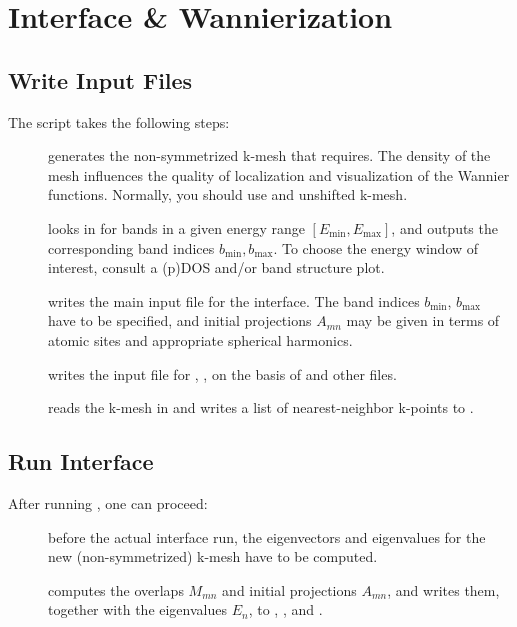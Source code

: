 \section{Interface \& Wannierization}
\label{sec:quitckstart_main}

\subsection{Write Input Files}
\label{sec:init}

The script \initwiiw takes the following steps:
%
\begin{description}
\item[] generates the non-symmetrized k-mesh that
  \wannier requires.  The density of the mesh influences the quality
  of localization and visualization of the Wannier functions.
  Normally, you should use and unshifted k-mesh.
\item[] looks in  for bands in a
  given energy range $[E_\text{min}, E_\text{max}]$, and outputs the
  corresponding band indices $b_\text{min}, b_\text{max}$.  To choose
  the energy window of interest, consult a (p)DOS and/or band
  structure plot.
\item[\writeinwf] writes the main input file  for the
  interface.  The band indices $b_\text{min}$, $b_\text{max}$ have to
  be specified, and initial projections $A_{mn}$ may be given in terms
  of atomic sites and appropriate spherical harmonics.
\item[\writewin] writes the input file for \wannierx, ,
  on the basis of  and other files.
\item[] reads the k-mesh in  and
  writes a list of nearest-neighbor k-points to .
\end{description}


\subsection{Run Interface}
After running \initwiiw, one can proceed:
\begin{description}
\item[] before the actual interface run, the
  eigenvectors and eigenvalues for the new (non-symmetrized) k-mesh
  have to be computed.
\item[] computes the overlaps $M_{mn}$ and initial
  projections $A_{mn}$, and writes them, together with the eigenvalues
  $E_n$, to , , and .
\end{description}



